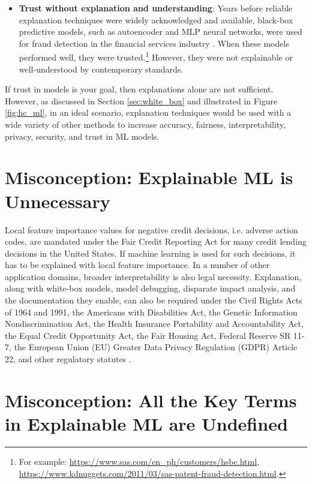 \documentclass[fleqn]{article}
\begin{document}
\begin{itemize}
\item \textbf{Trust without explanation and understanding}: Years before reliable explanation techniques were widely acknowledged and available, black-box predictive models, such as autoencoder and MLP neural networks, were used for fraud detection in the financial services industry \cite{gopinathan1998fraud}. When these models performed well, they were trusted.\footnote{For example: \url{https://www.sas.com/en_ph/customers/hsbc.html}, \url{https://www.kdnuggets.com/2011/03/sas-patent-fraud-detection.html}.} However, they were not explainable or well-understood by contemporary standards.  

\end{itemize}

If trust in models is your goal, then explanations alone are not sufficient. However, as discussed in Section \ref{sec:white_box} and illustrated in Figure \ref{fig:hc_ml}, in an ideal scenario, explanation techniques would be used with a wide variety of other methods to increase accuracy, fairness, interpretability, privacy, security, and trust in ML models. 

\section{Misconception: Explainable ML is Unnecessary}

Local feature importance values for negative credit decisions, i.e. adverse action codes, are mandated under the Fair Credit Reporting Act for many credit lending decisions in the United States. If machine learning is used for such decisions, it has to be explained with local feature importance. In a number of other application domains, broader interpretability is also legal necessity. Explanation, along with white-box models, model debugging, disparate impact analysis, and the documentation they enable, can also be required under the Civil Rights Acts of 1964 and 1991, the Americans with Disabilities Act, the Genetic Information Nondiscrimination Act, the Health Insurance Portability and Accountability Act, the Equal Credit Opportunity Act, the Fair Housing Act, Federal Reserve SR 11-7, the European Union (EU) Greater Data Privacy Regulation (GDPR) Article 22, and other regulatory statutes \cite{ff_interpretability}.

\section{Misconception: All the Key Terms in Explainable ML are Undefined}
\end{document}
